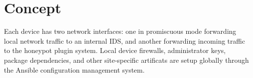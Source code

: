 \section*{\color{NavyBlue}Concept}

\large

\begin{center}
{
\scalebox{1.65}{}
}
\label{fig:concept}

\end{center}
\vspace{2cm}

Each device has two network interfaces: one in promiscuous mode forwarding
local network traffic to an internal IDS, and another forwarding incoming
traffic to the honeypot plugin system. Local device firewalls, administrator
keys, package dependencies, and other site-specific artificats are setup
globally through the Ansible configuration management system.
